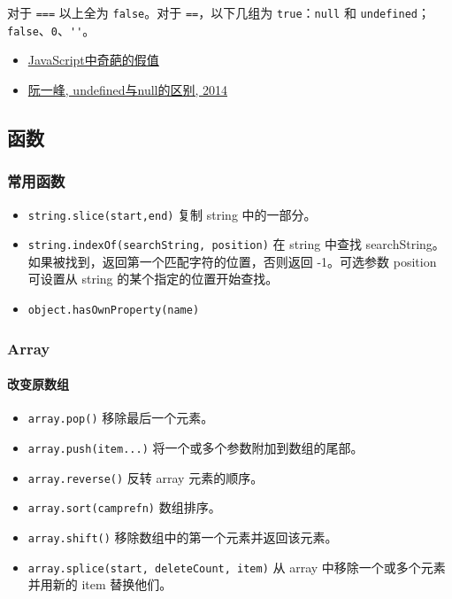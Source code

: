 对于 \lstinline!===! 以上全为 \lstinline!false!。对于
\lstinline!==!，以下几组为 \lstinline!true!：\lstinline!null! 和
\lstinline!undefined!；\lstinline!false!、\lstinline!0!、\lstinline!''!。

\begin{itemize}
\tightlist
\item
  \href{http://www.cnblogs.com/snandy/p/3589517.html}{JavaScript中奇葩的假值}
\item
  \href{http://www.ruanyifeng.com/blog/2014/03/undefined-vs-null.html}{阮一峰,
  undefined与null的区别, 2014}
\end{itemize}

\subsection{函数}\label{ux51fdux6570}

\subsubsection{常用函数}\label{ux5e38ux7528ux51fdux6570}

\begin{itemize}
\tightlist
\item
  \lstinline!string.slice(start,end)! 复制 string 中的一部分。
\item
  \lstinline!string.indexOf(searchString, position)! 在 string 中查找
  searchString。如果被找到，返回第一个匹配字符的位置，否则返回
  -1。可选参数 position 可设置从 string 的某个指定的位置开始查找。
\item
  \lstinline!object.hasOwnProperty(name)!
\end{itemize}

\subsubsection{Array}\label{array}

\paragraph{改变原数组}\label{ux6539ux53d8ux539fux6570ux7ec4}

\begin{itemize}
\tightlist
\item
  \lstinline!array.pop()! 移除最后一个元素。
\item
  \lstinline!array.push(item...)! 将一个或多个参数附加到数组的尾部。
\item
  \lstinline!array.reverse()! 反转 array 元素的顺序。
\item
  \lstinline!array.sort(camprefn)! 数组排序。
\item
  \lstinline!array.shift()! 移除数组中的第一个元素并返回该元素。
\item
  \lstinline!array.splice(start, deleteCount, item)! 从 array
  中移除一个或多个元素并用新的 item 替换他们。
\end{itemize}

